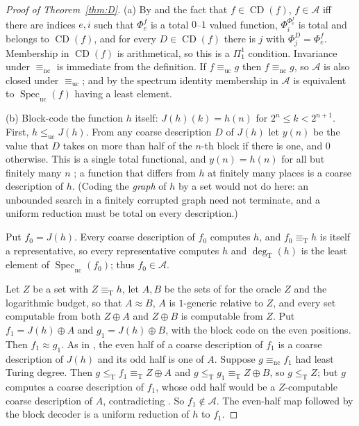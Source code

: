 \documentclass[11pt,letterpaper]{article}
\theoremstyle{definition}
\numberwithin{equation}{section}
\newcommand{\leT}{\le_{\mathrm T}}
\newcommand{\eqT}{\equiv_{\mathrm T}}
\newcommand{\leuc}{\le_{\mathrm{uc}}}
\newcommand{\eqnc}{\equiv_{\mathrm{nc}}}
\newcommand{\equc}{\equiv_{\mathrm{uc}}}
\newcommand{\nc}{\mathrm{nc}}
\newcommand{\uc}{\mathrm{uc}}
\newcommand{\CD}{\operatorname{CD}}
\newcommand{\Spec}{\operatorname{Spec}}
\newcommand{\degT}{\deg_{\mathrm T}}
\newcommand{\J}{J}
\begin{document}
\begin{proof}[Proof of Theorem~\ref{thm:D}]
(a) By \cite[Theorem~3.6(iv)]{Synthesis} and the fact that $f\in\CD(f)$, $f\in\mathcal A$ iff there are indices $e,i$ such that $\Phi_e^f$ is a total $0$--$1$ valued function, $\Phi_i^{\Phi_e^f}$ is total and belongs to $\CD(f)$, and for every $D\in\CD(f)$ there is $j$ with $\Phi_j^D=\Phi_e^f$. Membership in $\CD(f)$ is arithmetical, so this is a $\Pi^1_1$ condition. Invariance under $\eqnc$ is immediate from the definition. If $f\equc g$ then $f\eqnc g$, so $\mathcal A$ is also closed under $\equc$; and by the spectrum identity \cite[Theorem~3.1]{Synthesis} membership in $\mathcal A$ is equivalent to $\Spec_{\uc}(f)$ having a least element.

(b) Block-code the function $h$ itself: $\J(h)(k)=h(n)$ for $2^n\le k<2^{n+1}$. First, $h\leuc\J(h)$. From any coarse description $D$ of $\J(h)$ let $y(n)$ be the value that $D$ takes on more than half of the $n$-th block if there is one, and $0$ otherwise. This is a single total functional, and $y(n)=h(n)$ for all but finitely many $n$ \cite[Lemma~3.4]{Synthesis}; a function that differs from $h$ at finitely many places is a coarse description of $h$. (Coding the \emph{graph} of $h$ by a set would not do here: an unbounded search in a finitely corrupted graph need not terminate, and a uniform reduction must be total on every description.)

Put $f_0=\J(h)$. Every coarse description of $f_0$ computes $h$, and $f_0\eqT h$ is itself a representative, so every representative computes $h$ and $\degT(h)$ is the least element of $\Spec_{\nc}(f_0)$; thus $f_0\in\mathcal A$.

Let $Z$ be a set with $Z\eqT h$, let $A,B$ be the sets of \cite[Theorem~8.7]{Synthesis} for the oracle $Z$ and the logarithmic budget, so that $A\approx B$, $A$ is $1$-generic relative to $Z$, and every set computable from both $Z\oplus A$ and $Z\oplus B$ is computable from $Z$. Put $f_1=\J(h)\oplus A$ and $g_1=\J(h)\oplus B$, with the block code on the even positions. Then $f_1\approx g_1$. As in \cite[Lemma~9.1]{Synthesis}, the even half of a coarse description of $f_1$ is a coarse description of $\J(h)$ and its odd half is one of $A$. Suppose $g\eqnc f_1$ had least Turing degree. Then $g\leT f_1\eqT Z\oplus A$ and $g\leT g_1\eqT Z\oplus B$, so $g\leT Z$; but $g$ computes a coarse description of $f_1$, whose odd half would be a $Z$-computable coarse description of $A$, contradicting \cite[Lemma~5.1]{Synthesis}. So $f_1\notin\mathcal A$. The even-half map followed by the block decoder is a uniform reduction of $h$ to $f_1$.


\end{proof}
\end{document}
